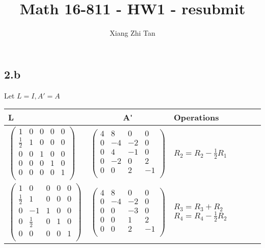 \documentclass{article}
\begin{document}
\title{Math 16-811 - HW1 - resubmit}
\author{Xiang Zhi Tan}

\maketitle
\subsection*{2.b}
Let $ L = I, A' = A$ \\
\begin{tabular}{|l|c|p{5cm}|}
\hline
\textbf{L} & \textbf{A\'} & \textbf{Operations}\\
\hline
$\begin{pmatrix}
    1 & 0 & 0 & 0 & 0\\
    \frac{1}{2} & 1 & 0 & 0 & 0\\
    0 & 0 & 1 & 0 & 0\\
    0 & 0 & 0 & 1 & 0\\
    0 & 0 & 0 & 0 & 1\\
\end{pmatrix}$
&
$\begin{pmatrix}
    4 & 8 & 0 & 0 \\
    0 & -4 & -2 & 0 \\
    0 & 4 & -1 & 0 \\
    0 & -2 & 0 & 2 \\
    0 & 0 & 2 & -1 \\
\end{pmatrix}$
&
$R_2 = R_2 - \frac{1}{2} R_1 $ \\
\hline
$\begin{pmatrix}
    1 & 0 & 0 & 0 & 0\\
    \frac{1}{2} & 1 & 0 & 0 & 0\\
    0 & -1 & 1 & 0 & 0\\
    0 & \frac{1}{2} & 0 & 1  &0\\
    0 & 0 & 0 & 0 & 1\\
\end{pmatrix}$
&
$\begin{pmatrix}
    4 & 8 & 0 & 0 \\
    0 & -4 & -2 & 0 \\
    0 & 0 & -3 & 0 \\
    0 & 0 & 1 & 2 \\
    0 & 0 & 2 & -1 \\
\end{pmatrix}$
&
$R_3 = R_3 + R_2$ \newline
$R_4 = R_4 - \frac{1}{2} R_2$\\

\end{tabular}
\end{document}
